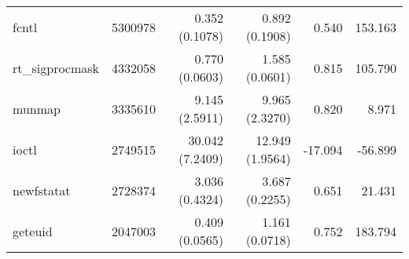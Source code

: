 \begin{tabular}{>{\ttfamily}lrrrrr}
                          fcntl &    5300978 &           0.352 (0.1078) &           0.892 (0.1908) &           0.540 &      153.163 \\
                rt\_sigprocmask &    4332058 &           0.770 (0.0603) &           1.585 (0.0601) &           0.815 &      105.790 \\
                         munmap &    3335610 &           9.145 (2.5911) &           9.965 (2.3270) &           0.820 &        8.971 \\
                          ioctl &    2749515 &          30.042 (7.2409) &          12.949 (1.9564) &         -17.094 &      -56.899 \\
                     newfstatat &    2728374 &           3.036 (0.4324) &           3.687 (0.2255) &           0.651 &       21.431 \\
                        geteuid &    2047003 &           0.409 (0.0565) &           1.161 (0.0718) &           0.752 &      183.794 \\
\bottomrule
\end{tabular}
